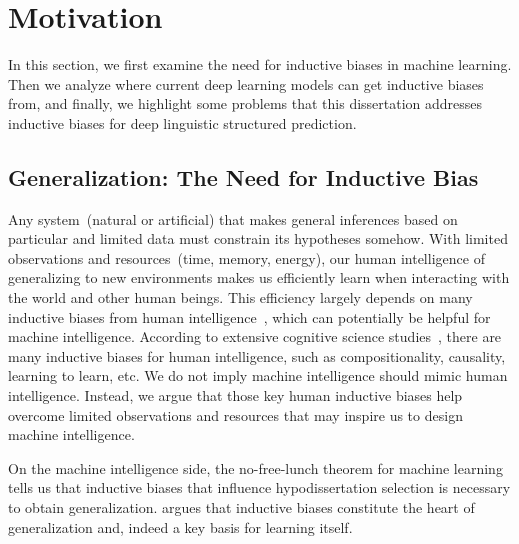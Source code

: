 \section{Motivation}
\label{sec:intro:motivation}

In this section, we first examine the need for inductive biases in
machine learning. Then we analyze where current deep learning models
can get inductive biases from, and finally, we highlight some problems
that this dissertation addresses inductive biases for deep linguistic
structured prediction.

\subsection{Generalization: The Need for Inductive Bias}
\label{ssec:intro:need-of-bias}

Any system~(natural or artificial) that makes general inferences based
on particular and limited data must constrain its hypotheses
somehow. With limited observations and resources~(time, memory,
energy), our human intelligence of generalizing to new environments
makes us efficiently learn when interacting with the world and other
human beings. This efficiency largely depends on many inductive biases
from human intelligence~\citep{Gershman2021WhatMU}, which can
potentially be helpful for machine intelligence. According to
extensive cognitive science
studies~\citep{Spelke1990PrinciplesOO,Bienenstock1996CompositionalityMP,Rehder2003ACT,harlow1949formation,
  Lake2016BuildingMT,Gershman2021WhatMU}, there are many inductive
biases for human intelligence, such as compositionality, causality,
learning to learn, etc. We do not imply machine intelligence should
mimic human intelligence. Instead, we argue that those key human
inductive biases help overcome limited observations and resources that
may inspire us to design machine intelligence.

On the machine intelligence side, the no-free-lunch theorem for
machine learning~\citep{baxter2000model,wolpert1995no} tells us that
inductive biases that influence hypodissertation selection is necessary to
obtain generalization. \citet{mitchell1980need} argues that inductive
biases constitute the heart of generalization and, indeed a key basis
for learning itself.

